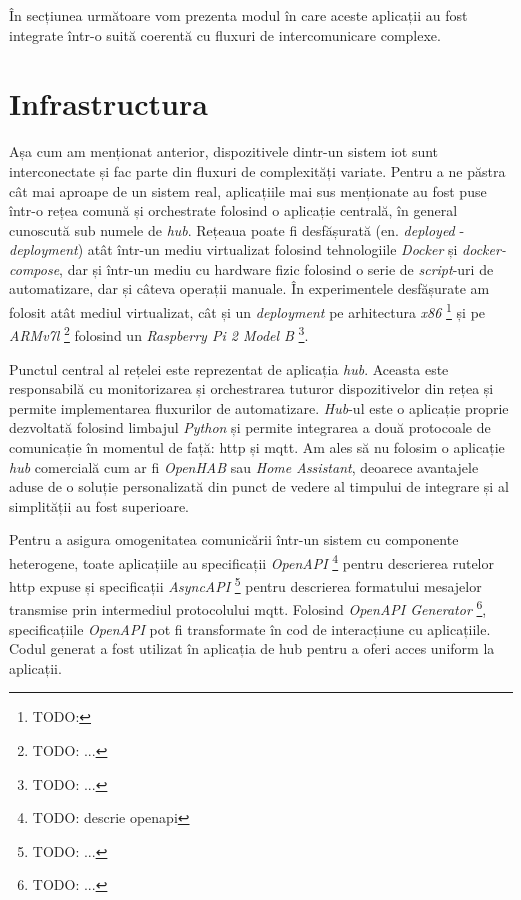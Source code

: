 
În secțiunea următoare vom prezenta modul în care aceste aplicații au fost integrate într-o suită coerentă cu fluxuri de intercomunicare complexe.

\section{Infrastructura}

Așa cum am menționat anterior, dispozitivele dintr-un sistem \acrshort{iot} sunt interconectate și fac parte din fluxuri de complexități variate. Pentru a ne păstra cât mai aproape de un sistem real, aplicațiile mai sus menționate au fost puse într-o rețea comună și orchestrate folosind o aplicație centrală, în general cunoscută sub numele de \textit{hub}. Rețeaua poate fi desfășurată (en. \textit{deployed} - \textit{deployment}) atât într-un mediu virtualizat folosind tehnologiile \textit{Docker} și \textit{docker-compose}, dar și într-un mediu cu hardware fizic folosind o serie de \textit{script}-uri de automatizare, dar și câteva operații manuale. În experimentele desfășurate am folosit atât mediul virtualizat, cât și un \textit{deployment} pe arhitectura \textit{x86} \footnote{TODO: } și pe \textit{ARMv7l} \footnote{TODO: ...} folosind un \textit{Raspberry Pi 2 Model B} \footnote{TODO: ...}. 

Punctul central al rețelei este reprezentat de aplicația \textit{hub}. Aceasta este responsabilă cu monitorizarea și orchestrarea tuturor dispozitivelor din rețea și permite implementarea fluxurilor de automatizare. \textit{Hub}-ul este o aplicație proprie dezvoltată folosind limbajul \textit{Python} și permite integrarea a două protocoale de comunicație în momentul de față: \acrshort{http} și \acrshort{mqtt}. Am ales să nu folosim o aplicație \textit{hub} comercială cum ar fi \textit{OpenHAB} sau \textit{Home Assistant}, deoarece avantajele aduse de o soluție personalizată din punct de vedere al timpului de integrare și al simplității au fost superioare.

Pentru a asigura omogenitatea comunicării într-un sistem cu componente heterogene, toate aplicațiile au specificații \textit{OpenAPI} \footnote{TODO: descrie openapi} pentru descrierea rutelor \acrshort{http} expuse și specificații \textit{AsyncAPI} \footnote{TODO: ...} pentru descrierea formatului mesajelor transmise prin intermediul protocolului \acrshort{mqtt}. Folosind \textit{OpenAPI Generator} \footnote{TODO: ...}, specificațiile \textit{OpenAPI} pot fi transformate în cod de interacțiune cu aplicațiile. Codul generat a fost utilizat în aplicația de hub pentru a oferi acces uniform la aplicații.

